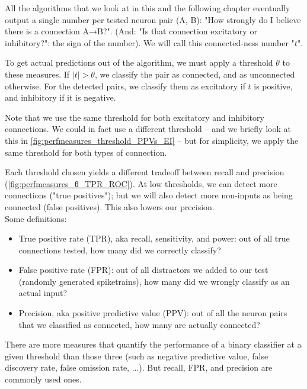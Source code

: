 All the algorithms that we look at in this and the following chapter eventually output a single number per tested neuron pair (A, B): "How strongly do I believe there is a connection A→B?". (And: "Is that connection excitatory or inhibitory?": the sign of the number). We will call this connected-ness number "$t$".

To get actual predictions out of the algorithm,
we must apply a threshold $θ$ to these measures. If $|t| > θ$, we classify the pair as connected, and as unconnected otherwise. For the detected pairs, we classify them as excitatory if $t$ is positive, and inhibitory if it is negative.

Note that we use the same threshold for both excitatory and inhibitory connections. We could in fact use a different threshold -- and we briefly look at this in \cref{fig:perfmeasures_threshold_PPVs_EI} -- but for simplicity, we apply the same threshold for both types of connection.

Each threshold chosen yields a different tradeoff between recall and precision (\cref{fig:perfmeasures_θ_TPR_ROC}). At low thresholds, we can detect more connections ("true positives"); but we will also detect more non-inputs as being connected (false positives). This also lowers our precision.\\
Some definitions:
\begin{itemize}
    \item True positive rate (TPR), aka recall, sensitivity, and power: out of all true connections tested, how many did we correctly classify?
    \item False positive rate (FPR): out of all distractors we added to our test (randomly generated spiketrains), how many did we wrongly classify as an actual input?
    \item Precision, aka positive predictive value (PPV): out of all the neuron pairs that we classified as connected, how many are actually connected?
\end{itemize}

There are more measures that quantify the performance of a binary classifier at a given threshold than those three (such as negative predictive value, false discovery rate, false omission rate, ...).\footnotemark{}
But recall, FPR, and precision are commonly used ones.

